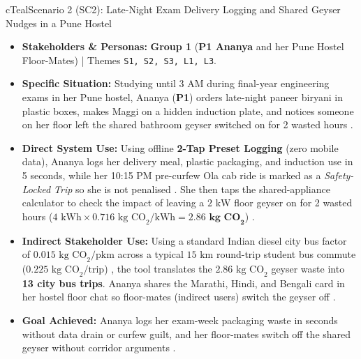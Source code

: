 \documentclass[12pt, a4paper]{article}
\begin{document}
\begin{scenariocard}{cTeal}{Scenario 2 (SC2): Late-Night Exam Delivery Logging and Shared Geyser Nudges in a Pune Hostel}
\footnotesize
\begin{itemize}
    \item \textbf{Stakeholders \& Personas:} \textbf{Group 1} (\textbf{P1 Ananya} and her Pune Hostel Floor-Mates) | Themes \texttt{S1, S2, S3, L1, L3}.
    \item \textbf{Specific Situation:} Studying until 3 AM during final-year engineering exams in her Pune hostel, Ananya (\textbf{P1}) orders late-night paneer biryani in plastic boxes, makes Maggi on a hidden induction plate, and notices someone on her floor left the shared bathroom geyser switched on for 2 wasted hours \cite{cf1, cf7}.
    \item \textbf{Direct System Use:} Using offline \textbf{2-Tap Preset Logging} (zero mobile data), Ananya logs her delivery meal, plastic packaging, and induction use in 5 seconds, while her 10:15 PM pre-curfew Ola cab ride is marked as a \textit{Safety-Locked Trip} so she is not penalised \cite{cf1}. She then taps the shared-appliance calculator to check the impact of leaving a $2\text{ kW}$ floor geyser on for 2 wasted hours ($4\text{ kWh} \times 0.716\text{ kg CO}_2/\text{kWh} = \mathbf{2.86\text{ kg CO}_2}$) \cite{cea2023, cf1}.
    \item \textbf{Indirect Stakeholder Use:} Using a standard Indian diesel city bus factor of $0.015\text{ kg CO}_2/\text{pkm}$ across a typical $15\text{ km}$ round-trip student bus commute ($0.225\text{ kg CO}_2/\text{trip}$) \cite{wri2015}, the tool translates the $2.86\text{ kg CO}_2$ geyser waste into \textbf{13 city bus trips}. Ananya shares the Marathi, Hindi, and Bengali card in her hostel floor chat so floor-mates (indirect users) switch the geyser off \cite{cf1, cf7}.
    \item \textbf{Goal Achieved:} Ananya logs her exam-week packaging waste in seconds without data drain or curfew guilt, and her floor-mates switch off the shared geyser without corridor arguments \cite{cf1}.
\end{itemize}
\end{scenariocard}
\end{document}
